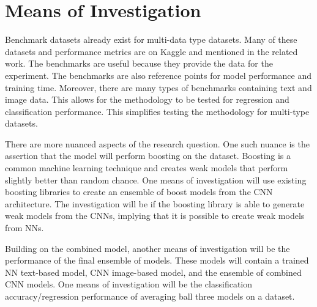 \section{Means of Investigation} %

Benchmark datasets already exist for multi-data type datasets.  Many of these datasets and performance metrics are on Kaggle and mentioned in the related work.  The benchmarks are useful because they provide the data for the experiment.  The benchmarks are also reference points for model performance and training time.  Moreover, there are many types of benchmarks containing text and image data.  This allows for the methodology to be tested for regression and classification performance.  This simplifies testing the methodology for multi-type datasets.

There are more nuanced aspects of the research question.  One such nuance is the assertion that the model will perform boosting on the dataset.  Boosting is a common machine learning technique and creates weak models that perform slightly better than random chance.  One means of investigation will use existing boosting libraries to create an ensemble of boost models from the CNN architecture.  The investigation will be if the boosting library is able to generate weak models from the CNNs, implying that it is possible to create weak models from NNs.  

Building on the combined model, another means of investigation will be the performance of the final ensemble of models.  These models will contain a trained NN text-based model, CNN image-based model, and the ensemble of combined CNN models.  One means of investigation will be the classification accuracy/regression performance of averaging ball three models on a dataset.





